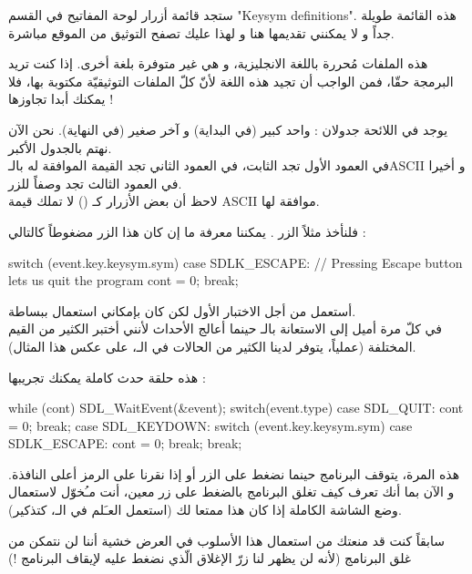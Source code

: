 ستجد قائمة أزرار لوحة المفاتيح في القسم
"\textenglish{Keysym definitions}".
هذه القائمة طويلة جداً و لا يمكنني تقديمها هنا و لهذا عليك تصفح التوثيق من الموقع مباشرة. 

هذه الملفات مُحررة باللغة الانجليزية، و هي غير متوفرة بلغة أخرى. إذا كنت تريد البرمجة حقّا، فمن الواجب أن تجيد هذه اللغة لأنّ  كلّ الملفات التوثيقيّة مكتوبة بها، فلا يمكنك أبدا تجاوزها !

يوجد في اللائحة جدولان : واحد كبير (في البداية) و آخر صغير (في النهاية). نحن الآن نهتم بالجدول الأكبر.\\
في العمود الأول تجد الثابت، في العمود الثاني تجد القيمة الموافقة له بالـ\textenglish{ASCII}
و أخيرا في العمود الثالث تجد وصفاً للزر.\\
لاحظ أن بعض الأزرار كـ
()
لا تملك قيمة
\textenglish{ASCII}
موافقة لها.

فلنأخذ مثلاً الزر
.
يمكننا معرفة ما إن كان هذا الزر مضغوطاً كالتالي :

\begin{Csource}
switch (event.key.keysym.sym)
{
	case SDLK_ESCAPE: // Pressing Escape button lets us quit the program
	cont = 0;
	break;
}
\end{Csource}

\begin{information}
أستعمل
من أجل الاختبار الأول لكن كان بإمكاني استعمال
ببساطة.\\
في كلّ مرة أميل إلى الاستعانة بالـ
حينما أعالج الأحداث لأنني أختبر الكثير من القيم المختلفة (عملياً، يتوفر لدينا الكثير من الحالات في الـ،
على عكس هذا المثال).
\end{information}

هذه حلقة حدث كاملة يمكنك تجريبها :

\begin{Csource}
while (cont)
{
	SDL_WaitEvent(&event);
	switch(event.type)
	{
		case SDL_QUIT:
		cont = 0;
		break;
		case SDL_KEYDOWN:
		switch (event.key.keysym.sym)
		{
			case SDLK_ESCAPE: 
			cont = 0;
			break;
		}
		break;
	}
}
\end{Csource}

\begin{information}
هذه المرة، يتوقف البرنامج حينما نضغط على الزر
أو إذا نقرنا على الرمز
أعلى النافذة. و الآن بما أنك تعرف كيف تغلق البرنامج بالضغط على زر معين، أنت مـُخوّل لاستعمال وضع الشاشة الكاملة إذا كان هذا ممتعا لك (استعمل العـَلم
في الـ،
كتذكير).
\end{information}

سابقاً كنت قد منعتك من استعمال هذا الأسلوب في العرض خشية أننا لن نتمكن من غلق البرنامج (لأنه لن يظهر لنا زرّ الإغلاق الّذي نضغط عليه لإيقاف البرنامج !)
